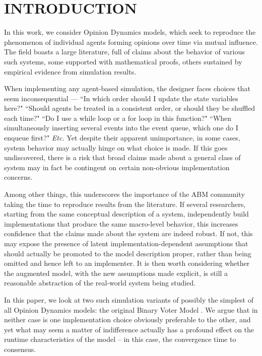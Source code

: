 
\section{INTRODUCTION}

In this work, we consider Opinion Dynamics models, which seek to reproduce
the phenomenon of individual agents forming opinions over time via mutual
influence. The field boasts a large literature, full of claims about the
behavior of various such systems, some supported with mathematical proofs,
others sustained by empirical evidence from simulation results.

When implementing any agent-based simulation, the designer faces choices that
seem inconsequential --- ``In which order should I update the state variables
here?" ``Should agents be treated in a consistent order, or should they be
shuffled each time?" ``Do I use a while loop or a for loop in this function?"
``When simultaneously inserting several events into the event queue, which one
do I enqueue first?" \textit{Etc.} Yet despite their apparent unimportance, in
some cases, system behavior may actually hinge on what choice is made. If this
goes undiscovered, there is a risk that broad claims made about a general
class of system may in fact be contingent on certain non-obvious
implementation concerns.

Among other things, this underscores the importance of the ABM community
taking the time to reproduce results from the literature. If several
researchers, starting from the same conceptual description of a system,
independently build implementations that produce the same macro-level
behavior, this increases confidence that the claims made about the system are
indeed robust. If not, this may expose the presence of latent
implementation-dependent assumptions that should actually be promoted to the
model description proper, rather than being omitted and hence left to an
implementer. It is then worth considering whether the augmented model, with
the new assumptions made explicit, is still a reasonable abstraction of the
real-world system being studied.

In this paper, we look at two such simulation variants of possibly the
simplest of all Opinion Dynamics models: the original Binary Voter Model
\cite{holley_ergodic_1975,clifford_model_1973}. We argue that in neither case
is one implementation choice obviously preferable to the other, and yet what
may seem a matter of indifference actually has a profound effect on the
runtime characteristics of the model -- in this case, the convergence time to
consensus.

